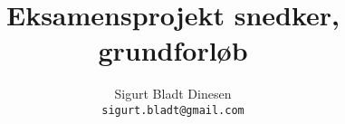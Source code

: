 \documentclass[a4paper, titlepage]{report}
\begin{document}
\title{Eksamensprojekt snedker, grundforløb}
\author{Sigurt Bladt Dinesen
	\\\texttt{sigurt.bladt@gmail.com}
}

\maketitle


\end{document}
